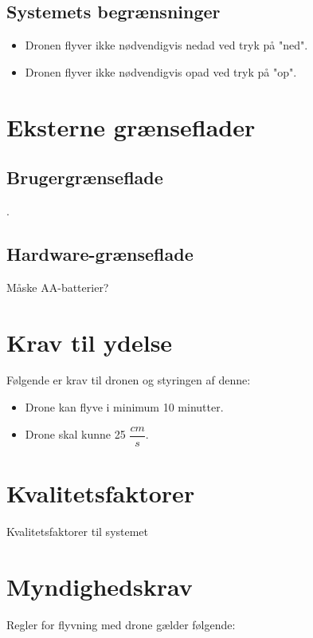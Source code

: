 \documentclass[Main]{subfiles}
\begin{document}
	
\section{Systemets begrænsninger}
\begin{itemize}
\item Dronen flyver ikke nødvendigvis nedad ved tryk på "ned".
\item Dronen flyver ikke nødvendigvis opad ved tryk på "op".
\end{itemize}






\chapter{Eksterne grænseflader}

\section{Brugergrænseflade}
.

\section{Hardware-grænseflade}
Måske AA-batterier?





\chapter{Krav til ydelse}
Følgende er krav til dronen og styringen af denne:

	\begin{itemize}
	\item Drone kan flyve i minimum 10 minutter.
	\item Drone skal kunne 25 $\dfrac{cm}{s}$.
	\end{itemize}



\chapter{Kvalitetsfaktorer}
Kvalitetsfaktorer til systemet

\chapter{Myndighedskrav}
Regler for flyvning med drone gælder følgende:
\end{document}
